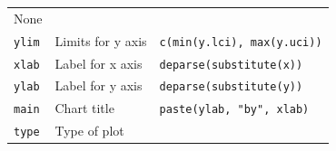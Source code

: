 \documentclass[12pt,a4paper]{book}
\theoremstyle{definition}
\theoremstyle{definition}
\theoremstyle{definition}
\theoremstyle{remark}
\begin{document}
\begin{longtable}[]{@{}lll@{}}
\begin{minipage}[t]{0.39\columnwidth}
None\strut
\end{minipage}\tabularnewline
\begin{minipage}[t]{0.15\columnwidth}\raggedright
\texttt{ylim}\strut
\end{minipage} & \begin{minipage}[t]{0.32\columnwidth}\raggedright
Limits for y axis\strut
\end{minipage} & \begin{minipage}[t]{0.39\columnwidth}\raggedright
\texttt{c(min(y.lci),\ max(y.uci))}\strut
\end{minipage}\tabularnewline
\begin{minipage}[t]{0.15\columnwidth}\raggedright
\texttt{xlab}\strut
\end{minipage} & \begin{minipage}[t]{0.32\columnwidth}\raggedright
Label for x axis\strut
\end{minipage} & \begin{minipage}[t]{0.39\columnwidth}\raggedright
\texttt{deparse(substitute(x))}\strut
\end{minipage}\tabularnewline
\begin{minipage}[t]{0.15\columnwidth}\raggedright
\texttt{ylab}\strut
\end{minipage} & \begin{minipage}[t]{0.32\columnwidth}\raggedright
Label for y axis\strut
\end{minipage} & \begin{minipage}[t]{0.39\columnwidth}\raggedright
\texttt{deparse(substitute(y))}\strut
\end{minipage}\tabularnewline
\begin{minipage}[t]{0.15\columnwidth}\raggedright
\texttt{main}\strut
\end{minipage} & \begin{minipage}[t]{0.32\columnwidth}\raggedright
Chart title\strut
\end{minipage} & \begin{minipage}[t]{0.39\columnwidth}\raggedright
\texttt{paste(ylab,\ "by",\ xlab)}\strut
\end{minipage}\tabularnewline
\begin{minipage}[t]{0.15\columnwidth}\raggedright
\texttt{type}\strut
\end{minipage} & \begin{minipage}[t]{0.32\columnwidth}\raggedright
Type of plot\strut
\end{minipage} & \begin{minipage}[t]{0.39\columnwidth}\raggedright

\end{minipage}
\end{longtable}
\end{document}
